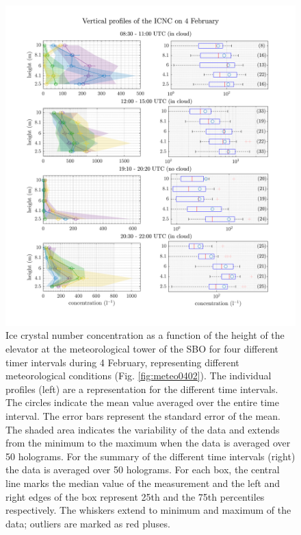 \documentclass[draft,linenumbers]{agujournal}
\begin{document}
{\begin{figure}[h]
 \centering
 	\includegraphics[width=14cm]{0402_Overview.png}
 \caption{Ice crystal number concentration as a function of the height of the elevator at the meteorological tower of the SBO for four different timer intervals during 4 February, representing different meteorological conditions (Fig. \ref{fig:meteo0402}). The individual profiles (left) are a representation for the different time intervals. The circles indicate the mean value averaged over the entire time interval. The error bars represent the standard error of the mean. The shaded area indicates the variability of the data and extends from the minimum to the maximum when the data is averaged over 50 holograms. For the summary of the different time intervals (right) the data is averaged over 50 holograms. For each box, the central line marks the median value of the measurement and the left and right edges of the box represent 25th and the 75th percentiles respectively. The whiskers extend to minimum and maximum of the data; outliers are marked as red pluses.}
 \label{fig:profiles0402}
\end{figure}

}
\end{document}
